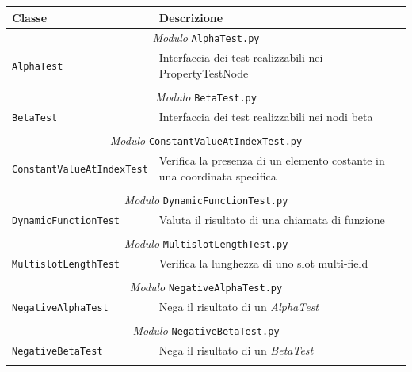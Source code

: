 \begin{longtable}{p{5.5cm}p{6.5cm}}
\hline 
\textbf{Classe} & \textbf{Descrizione} \\ 
\hline\hline 
\endhead

\multicolumn{2}{c}{\emph{Modulo} \texttt{AlphaTest.py}}\\
	\hdashline[5pt/5pt]
		\texttt{AlphaTest} & Interfaccia dei test realizzabili nei PropertyTestNode \\ 
	\hline\\

\multicolumn{2}{c}{\emph{Modulo} \texttt{BetaTest.py}}\\
	\hdashline[5pt/5pt]
		\texttt{BetaTest} & Interfaccia dei test realizzabili nei nodi beta \\ 
	\hline\\

\multicolumn{2}{c}{\emph{Modulo} \texttt{ConstantValueAtIndexTest.py}}\\
	\hdashline[5pt/5pt]
		\texttt{ConstantValueAtIndexTest} & Verifica la presenza di un elemento costante in una coordinata specifica \\ 
	\hline\\

\multicolumn{2}{c}{\emph{Modulo} \texttt{DynamicFunctionTest.py}}\\
	\hdashline[5pt/5pt]
		\texttt{DynamicFunctionTest} & Valuta il risultato di una chiamata di funzione \\ 
	\hline\\

\multicolumn{2}{c}{\emph{Modulo} \texttt{MultislotLengthTest.py}}\\
	\hdashline[5pt/5pt]
		\texttt{MultislotLengthTest} & Verifica la lunghezza di uno slot multi-field \\ 
	\hline\\

\multicolumn{2}{c}{\emph{Modulo} \texttt{NegativeAlphaTest.py}}\\
	\hdashline[5pt/5pt]
		\texttt{NegativeAlphaTest} & Nega il risultato di un \emph{AlphaTest}\\ 
	\hline\\
	
\multicolumn{2}{c}{\emph{Modulo} \texttt{NegativeBetaTest.py}}\\
	\hdashline[5pt/5pt]
		\texttt{NegativeBetaTest} & Nega il risultato di un \emph{BetaTest}\\ 
	\hline\\



\end{longtable}
